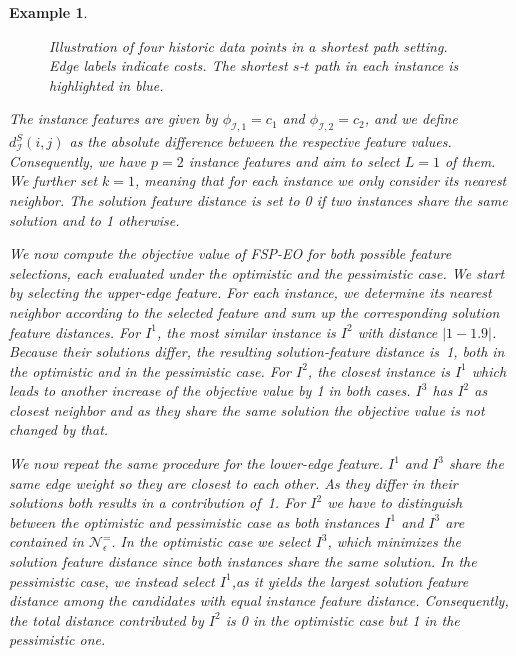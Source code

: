 \documentclass[11pt, a4paper]{article}
\newtheorem{example}{Example}
\newcommand{\fspeo}{FSP-EO\xspace}
\newcommand{\instance}{I}
\newcommand{\instanceindex}{i}
\newcommand{\fsel}{S} %
\newcommand{\selectionset}{\fsel}
\newcommand{\neighbour}{\ensuremath{\mathcal{N}}}
\newcommand{\sEpsBorder}[1][(\instanceindex,\selectionset)]{\ensuremath{\neighbour^=_\epsilon#1}}
\begin{document}
\begin{example}
\begin{figure}[h]
\begin{minipage}{0.33\textwidth}
	\end{minipage}
	
	
\caption{Illustration of four historic data points in a shortest path setting. Edge labels indicate costs. The shortest $s$-$t$ path in each instance is highlighted in blue.}
\label{fig:exampleSk}
\end{figure}

The instance features are given by \(\phi_{\mathcal{I},1}=c_1\) and \(\phi_{\mathcal{I},2}=c_2\), and we define \(d_{\mathcal{I}}^{\selectionset}(i,j)\) as the absolute difference between the respective feature values. Consequently, we have \(p=2\) instance features and aim to select \(L=1\) of them. We further set \(k=1\), meaning that for each instance we only consider its nearest neighbor. The solution feature distance is set to 0 if two instances share the same solution and to 1 otherwise.

We now compute the objective value of \fspeo for both possible feature selections, each evaluated under the optimistic and the pessimistic case. We start by selecting the upper-edge feature. For each instance, we determine its nearest neighbor according to the selected feature and sum up the corresponding solution feature distances. For \(\instance^1\), the most similar instance is \(\instance^2\) with distance \(|1 - 1.9|\). Because their solutions differ, the resulting solution-feature distance is~1, both in the optimistic and in the pessimistic case.
For \(\instance^2\), the closest instance is \(\instance^1\) which leads to another increase of the objective value by 1 in both cases.
\(\instance^3\) has \(\instance^2\) as closest neighbor and as they share the same solution the objective value is not changed by that.

We now repeat the same procedure for the lower-edge feature. 
\(\instance^1\) and \(\instance^3\) share the same edge weight so they are closest to each other. As they differ in their solutions both results in a contribution of~1.
For \(\instance^2\) we have to distinguish between the optimistic and pessimistic case as both instances \(\instance^1\) and \(\instance^3\) are contained in $\sEpsBorder[]$. In the optimistic case we select \(\instance^3\), which minimizes the solution feature distance since both instances share the same solution. In the pessimistic case, we instead select \(\instance^1\),as it yields the largest solution feature distance among the candidates with equal instance feature distance. Consequently, the total distance contributed by \(\instance^2\) is 0 in the optimistic case but 1 in the pessimistic one.


\end{example}
\end{document}
